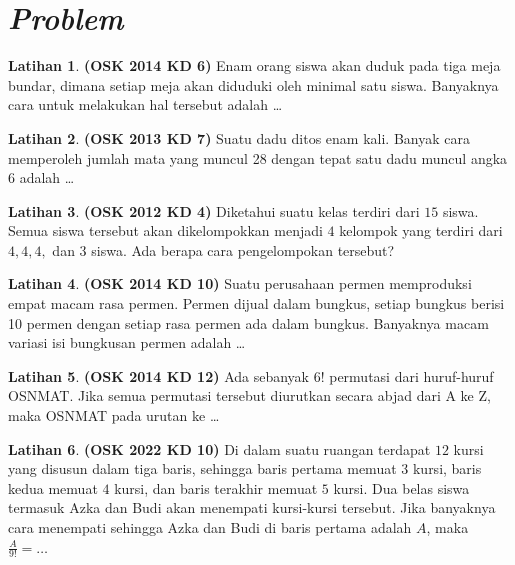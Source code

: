 \documentclass[aspectratio=169]{beamer}
\theoremstyle{definition}
\newtheorem{latihan}{Latihan}
\begin{document}
\section*{\textit{ Problem }}
\begin{frame}{\insertsection}
  \begin{latihan}
    \textbf{(OSK 2014 KD 6)} Enam orang siswa akan duduk pada tiga meja bundar, dimana setiap meja akan diduduki oleh minimal satu siswa. Banyaknya cara untuk melakukan hal tersebut adalah \ldots
  \end{latihan}
\end{frame}

\begin{frame}{\insertsection}
  \begin{latihan}
    \textbf{(OSK 2013 KD 7)} Suatu dadu ditos enam kali. Banyak cara memperoleh jumlah mata yang muncul 28 dengan tepat satu dadu muncul angka 6 adalah \ldots
  \end{latihan}
\end{frame}

\begin{frame}{\insertsection}
  \begin{latihan}
    \textbf{(OSK 2012 KD 4)} Diketahui suatu kelas terdiri dari $15$ siswa. Semua siswa tersebut akan dikelompokkan menjadi $4$ kelompok yang terdiri dari $4, 4, 4,$ dan $3$ siswa. Ada berapa cara pengelompokan tersebut?
  \end{latihan}
\end{frame}

\begin{frame}{\insertsection}
  \begin{latihan}
    \textbf{(OSK 2014 KD 10)}
    Suatu perusahaan permen memproduksi empat macam rasa permen. Permen dijual dalam bungkus, setiap bungkus berisi 10 permen dengan setiap rasa permen ada dalam bungkus. Banyaknya macam variasi isi bungkusan permen adalah \ldots
  \end{latihan}
\end{frame}

\begin{frame}{\insertsection}
  \begin{latihan}
    \textbf{(OSK 2014 KD 12)}
    Ada sebanyak $6!$ permutasi dari huruf-huruf OSNMAT. Jika semua permutasi tersebut diurutkan secara abjad dari A ke Z, maka OSNMAT pada urutan ke \ldots
  \end{latihan}
\end{frame}

\begin{frame}{\insertsection}
  \begin{latihan}
    \textbf{(OSK 2022 KD 10)}
    Di dalam suatu ruangan terdapat $12$ kursi yang disusun dalam tiga baris, sehingga baris pertama memuat $3$ kursi, baris kedua memuat $4$ kursi, dan baris terakhir memuat $5$ kursi. Dua belas siswa termasuk Azka dan Budi akan menempati kursi-kursi tersebut. Jika banyaknya cara menempati sehingga Azka dan Budi di baris pertama adalah $A$, maka $\frac{A}{9!} = \dots$
  \end{latihan}
\end{frame}
\end{document}
